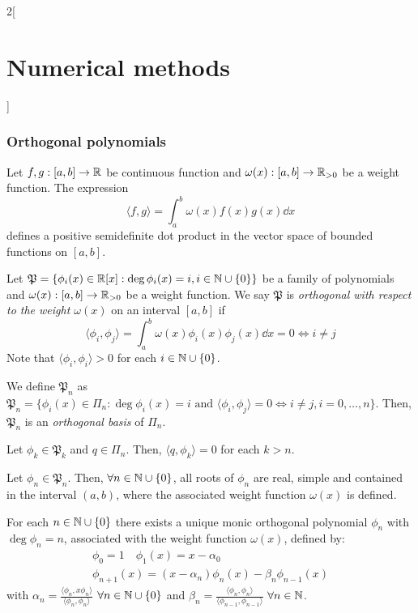 \documentclass[../../../main_math.tex]{subfiles}
\begin{document}
\begin{multicols}{2}[\section{Numerical methods}]
  \subsubsection{Orthogonal polynomials}
  \begin{definition}
    Let $f,g:[a,b]\rightarrow\mathbb{R}$ be continuous function and $\omega(x):[a,b]\rightarrow\mathbb{R}_{>0}$ be a weight function. The expression $$\langle f,g\rangle=\int_a^b\omega(x)f(x)g(x)\dd{x}$$ defines a positive semidefinite dot product in the vector space of bounded functions on $[a,b]$.
  \end{definition}
  \begin{definition}
    Let $\mathfrak{P}=\{\phi_i(x)\in\mathbb{R}[x]:\deg \phi_i(x)=i, i\in\mathbb{N}\cup\{0\}\}$ be a family of polynomials and $\omega(x):[a,b]\rightarrow\mathbb{R}_{>0}$ be a weight function. We say $\mathfrak{P}$ is \emph{orthogonal with respect to the weight $\omega(x)$} on an interval $[a,b]$ if $$\langle \phi_i,\phi_j\rangle=\int_a^b\omega(x)\phi_i(x)\phi_j(x)\dd{x}=0\iff i\ne j$$
    Note that $\langle \phi_i,\phi_i\rangle>0$ for each $i\in\mathbb{N}\cup\{0\}$.
  \end{definition}
  \begin{lemma}
    We define $\mathfrak{P}_n$ as $\mathfrak{P}_n=\{\phi_i(x)\in\Pi_n:\deg\phi_i(x)=i\text{ and }\langle \phi_i,\phi_j\rangle=0\iff i\ne j,  i=0,\ldots,n\}$. Then, $\mathfrak{P}_n$ is an \emph{orthogonal basis} of $\Pi_n$.
  \end{lemma}
  \begin{lemma}
    Let $\phi_k\in\mathfrak{P}_k$ and $q\in\Pi_n$. Then, $\langle q,\phi_k\rangle=0$ for each $k>n$.
  \end{lemma}
  \begin{lemma}
    Let $\phi_n\in\mathfrak{P}_n$. Then, $\forall n\in\mathbb{N}\cup\{0\}$, all roots of $\phi_n$ are real, simple and contained in the interval $(a,b)$, where the associated weight function $\omega(x)$ is defined.
  \end{lemma}
  \begin{theorem}
    For each $n\in\mathbb{N}\cup\{0\}$ there exists a unique monic orthogonal polynomial $\phi_n$ with $\deg\phi_n=n$, associated with the weight function $\omega(x)$, defined by:
    \begin{gather*}
      \phi_0=1\quad\phi_1(x)=x-\alpha_0\\
      \phi_{n+1}(x)=(x-\alpha_n)\phi_n(x)-\beta_n\phi_{n-1}(x)
    \end{gather*}
    with $\alpha_n=\frac{\langle\phi_n,x\phi_n\rangle}{\langle\phi_n,\phi_n\rangle}$ $\forall n\in\mathbb{N}\cup\{0\}$ and $\beta_n=\frac{\langle\phi_n,\phi_n\rangle}{\langle\phi_{n-1},\phi_{n-1}\rangle}$ $\forall n\in\mathbb{N}$.

\end{theorem}
\end{multicols}
\end{document}
